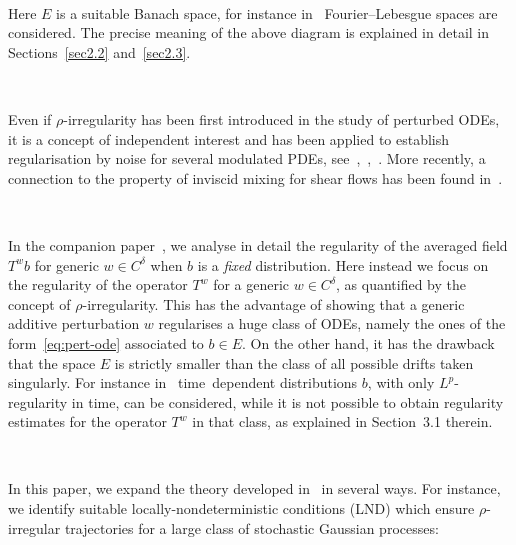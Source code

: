 \documentclass[10pt]{article}
\newcommand{\tmtextit}[1]{{\itshape{#1}}}
\begin{document}
\

Here $E$ is a suitable Banach space, for instance
in~{\cite{catelliergubinelli}} Fourier--Lebesgue spaces are considered. The
precise meaning of the above diagram is explained in detail in
Sections~\ref{sec2.2} and~\ref{sec2.3}.

\

Even if $\rho$-irregularity has been first introduced in the study of
perturbed ODEs, it is a concept of independent interest and has been applied
to establish regularisation by noise for several modulated PDEs,
see~{\cite{choukgubinelli1}},~{\cite{choukgubinelli2}},~{\cite{choukgess}}.
More recently, a connection to the property of inviscid mixing for shear flows
has been found in~{\cite{galeatigubinelli_mixing}}.

\

In the companion paper~{\cite{galeatigubinelli_ode}}, we analyse in detail
the regularity of the averaged field $T^w b$ for generic $w \in C^{\delta}$
when $b$ is a \tmtextit{fixed} distribution. Here instead we focus on the
regularity of the operator $T^w$ for a generic $w \in C^{\delta}$, as
quantified by the concept of $\rho$-irregularity. This has the advantage of
showing that a generic additive perturbation $w$ regularises a huge class of
ODEs, namely the ones of the form~\eqref{eq:pert-ode} associated to $b \in E$.
On the other hand, it has the drawback that the space $E$ is strictly smaller
than the class of all possible drifts taken singularly. For instance
in~{\cite{galeatigubinelli_ode}} time~dependent distributions $b$, with only
$L^p$-regularity in time, can be considered, while it is not possible to
obtain regularity estimates for the operator $T^w$ in that class, as explained
in Section~3.1 therein.

\

In this paper, we expand the theory developed in~{\cite{catelliergubinelli}}
in several ways. For instance, we identify suitable locally-nondeterministic
conditions (LND) which ensure $\rho$-irregular trajectories for a large class
of stochastic Gaussian processes:

\

\begin{center}
\end{center}
\end{document}
